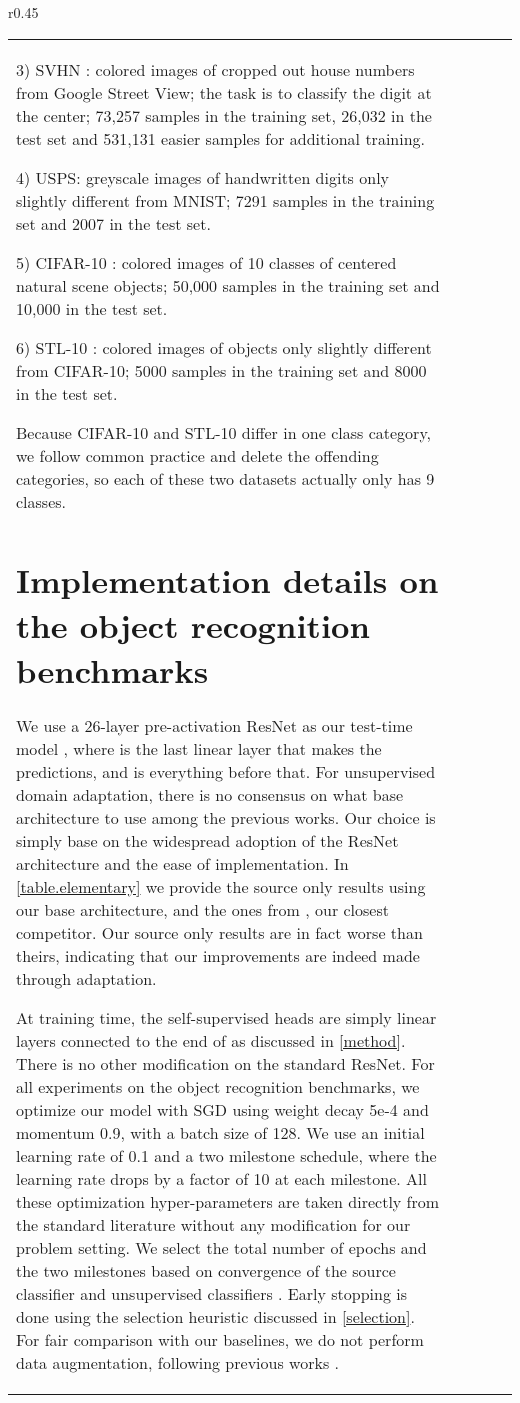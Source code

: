 \documentclass{article} \usepackage{iclr2020_conference,times}
\begin{document}
\begin{wraptable}{r}{0.45\textwidth}
\begin{tabular}{lcccc}
3) SVHN \citep{netzer2011reading}: colored images of cropped out house numbers from Google Street View; the task is to classify the digit at the center; 73,257 samples in the training set, 26,032 in the test set and 531,131 easier samples for additional training.

4) USPS: greyscale images of handwritten digits only slightly different from MNIST; 7291 samples in the training set and 2007 in the test set.

5) CIFAR-10 \citep{krizhevsky2009learning}: colored images of 10 classes of centered natural scene objects; 50,000 samples in the training set and 10,000 in the test set.

6) STL-10 \citep{coates2011analysis}: colored images of objects only slightly different from CIFAR-10; 5000 samples in the training set and 8000 in the test set.

Because CIFAR-10 and STL-10 differ in one class category, we follow common practice \citep{shu2018dirt,french2017self, ghifary2016deep} and delete the offending categories, so each of these two datasets actually only has 9 classes.

\section{Implementation details on the object recognition benchmarks}
We use a 26-layer pre-activation ResNet \citep{ he2016identity} as our test-time model , where  is the last linear layer that makes the predictions, and  is everything before that. 
For unsupervised domain adaptation, there is no consensus on what base architecture to use among the previous works.
Our choice is simply base on the widespread adoption of the ResNet architecture and the ease of implementation.
In \autoref{table.elementary} we provide the source only results using our base architecture, and the ones from \cite{shu2018dirt}, our closest competitor.
Our source only results are in fact worse than theirs, indicating that our improvements are indeed made through adaptation.

At training time, the self-supervised heads  are simply linear layers connected to the end of  as discussed in \autoref{method}. 
There is no other modification on the standard ResNet. 
For all experiments on the object recognition benchmarks, we optimize our model with SGD using weight decay 5e-4 and momentum 0.9, with a batch size of 128.
We use an initial learning rate of 0.1 and a two milestone schedule, where the learning rate drops by a factor of 10 at each milestone. 
All these optimization hyper-parameters are taken directly from the standard literature \citep{he2016identity, huang2016deep, guo2017calibration} without any modification for our problem setting.
We select the total number of epochs and the two milestones based on convergence of the source classifier  and unsupervised classifiers .
Early stopping is done using the selection heuristic discussed in \autoref{selection}. 
For fair comparison with our baselines, we do not perform data augmentation, following previous works
\citep{hoffman2017cycada, sener2016learning, ghifary2016deep}.


\end{tabular}
\end{wraptable}
\end{document}
